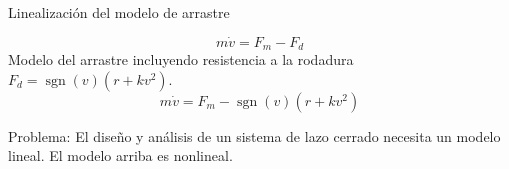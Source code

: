 \documentclass[dvisvgm,hypertex,aspectratio=169]{beamer}
\DeclareMathOperator{\sign}{sgn}
\begin{document}
\begin{frame}[label=L1]{Linealización del modelo de arrastre}

  \[ m\dot{v} = F_m - F_d\]
  Modelo del arrastre incluyendo resistencia a la rodadura \(F_d = \sign(v)(r + kv^2)\).
  \[ m\dot{v} = F_m -\sign(v)(r + kv^2)\]
  
\begin{center}
  \end{center}
  Problema: El diseño y análisis de un sistema de lazo cerrado necesita un modelo \alert{lineal}. El modelo arriba es \alert{nonlineal}.

\end{frame}
\end{document}

